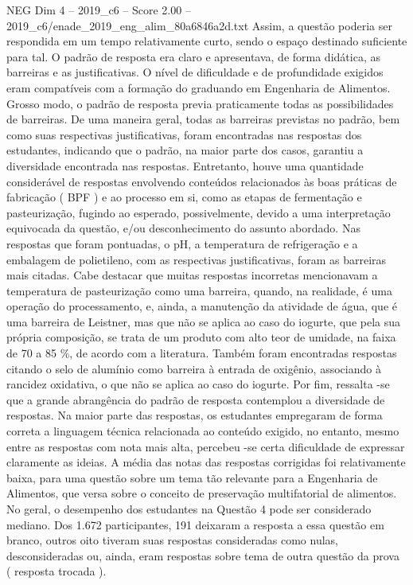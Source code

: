\begin{textsample}{NEG Dim 4 – 2019\_c6 – Score 2.00 – 2019\_c6/enade\_2019\_eng\_alim\_80a6846a2d.txt}
Assim, a questão poderia ser respondida em um tempo relativamente curto, sendo o espaço destinado suficiente para tal.
O padrão de resposta era claro e apresentava, de forma didática, as barreiras e as justificativas.
O nível de dificuldade e de profundidade exigidos eram compatíveis com a formação do graduando em Engenharia de Alimentos.
Grosso modo, o padrão de resposta previa praticamente todas as possibilidades de barreiras.
De uma maneira geral, todas as barreiras previstas no padrão, bem como suas respectivas justificativas, foram encontradas nas respostas dos estudantes, indicando que o padrão, na maior parte dos casos, garantiu a diversidade encontrada nas respostas.
Entretanto, houve uma quantidade considerável de respostas envolvendo conteúdos relacionados às boas práticas de fabricação ( BPF ) e ao processo em si, como as etapas de fermentação e pasteurização, fugindo ao esperado, possivelmente, devido a uma interpretação equivocada da questão, e/ou desconhecimento do assunto abordado.
Nas respostas que foram pontuadas, o pH, a temperatura de refrigeração e a embalagem de polietileno, com as respectivas justificativas, foram as barreiras mais citadas.
Cabe destacar que muitas respostas incorretas mencionavam a temperatura de pasteurização como uma barreira, quando, na realidade, é uma operação do processamento, e, ainda, a manutenção da atividade de água, que é uma barreira de Leistner, mas que não se aplica ao caso do iogurte, que pela sua própria composição, se trata de um produto com alto teor de umidade, na faixa de 70 a 85 \%, de acordo com a literatura.
Também foram encontradas respostas citando o selo de alumínio como barreira à entrada de oxigênio, associando à rancidez oxidativa, o que não se aplica ao caso do iogurte.
Por fim, ressalta -se que a grande abrangência do padrão de resposta contemplou a diversidade de respostas.
Na maior parte das respostas, os estudantes empregaram de forma correta a linguagem técnica relacionada ao conteúdo exigido, no entanto, mesmo entre as respostas com nota mais alta, percebeu -se certa dificuldade de expressar claramente as ideias.
A média das notas das respostas corrigidas foi relativamente baixa, para uma questão sobre um tema tão relevante para a Engenharia de Alimentos, que versa sobre o conceito de preservação multifatorial de alimentos.
No geral, o desempenho dos estudantes na Questão 4 pode ser considerado mediano.
Dos 1.672 participantes, 191 deixaram a resposta a essa questão em branco, outros oito tiveram suas respostas consideradas como nulas, desconsideradas ou, ainda, eram respostas sobre tema de outra questão da prova ( resposta trocada ).

\end{textsample}
